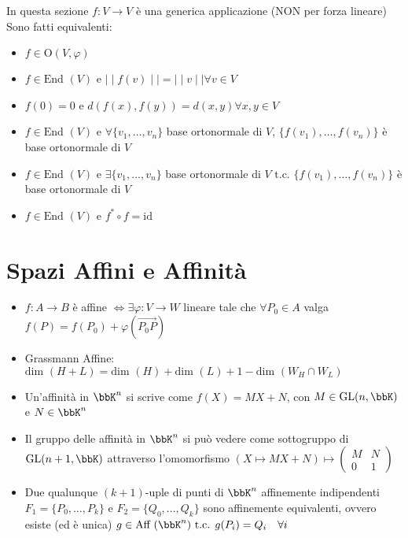 \documentclass[a4paper,NoNotes]{stdmdoc}
\newcommand{\tc}{\mbox{ t.c. }}
\newcommand{\Dim}{\mbox{dim }}
\newcommand{\End}{\mbox{End }}
\newcommand{\GL}{\mbox{GL}}
\newcommand{\Ort}{\mbox{O}}
\newcommand{\Aff}{\mbox{Aff }}
\newcommand{\Id}{\mbox{id}}
\newcommand{\Norm}[1]{\mid\mid #1 \mid\mid}
\newcommand{\sse}{\Leftrightarrow}
\begin{document}
	In questa sezione $f: V \rightarrow V$ è una generica applicazione (NON per forza lineare) \\
	Sono fatti equivalenti:
	\begin{itemize}
		\item $f \in \Ort(V, \varphi)$
		\item $f \in \End(V)$ e $\Norm{f(v)} = \Norm{v} \forall v \in V$
		\item $f(0)=0$ e $d(f(x), f(y)) = d(x, y) \forall x, y \in V$
		\item $f \in \End(V)$ e $\forall \{v_1, \ldots, v_n\}$ base ortonormale di $V$, $\{f(v_1), \ldots, f(v_n)\}$ è base ortonormale di $V$
		\item $f \in \End(V)$ e $\exists \{v_1, \ldots, v_n\}$ base ortonormale di $V \tc \{f(v_1), \ldots, f(v_n)\}$ è base ortonormale di $V$
		\item $f \in \End(V)$ e $f^{*} \circ f = \Id$
	\end{itemize}

	\section*{Spazi Affini e Affinità}
	\begin{itemize}
		\item $f: A \rightarrow B$ è affine $\sse \exists \varphi: V \rightarrow W$ lineare tale che $\forall P_0 \in A$ valga $f(P) = f(P_0) + \varphi(\overrightarrow{P_0P})$
		\item Grassmann Affine: $\Dim(H+L) = \Dim(H) + \Dim(L) + 1 - \Dim(W_H \cap W_L)$
		\item Un'affinità in $\bbK^n$ si scrive come $f(X) = MX+N$, con $M \in \GL(n, \bbK)$ e $N \in \bbK^n$
		\item Il gruppo delle affinità in $\bbK^n$ si può vedere come sottogruppo di $\GL(n+1, \bbK)$ attraverso l'omomorfismo $(X \mapsto MX + N) \mapsto \left( \begin{array}{c|c} M & N \\ \hline 0 & 1 \end{array} \right)$
		\item Due qualunque $(k+1)$-uple di punti di $\bbK^n$ affinemente indipendenti $F_1=\{P_0, \ldots, P_k\}$ e $F_2 = \{Q_0, \ldots, Q_k\}$ sono affinemente equivalenti, ovvero esiste (ed è unica) $g \in \Aff(\bbK^n) \tc g(P_i) = Q_i \quad \forall i$
	\end{itemize}
\end{document}
